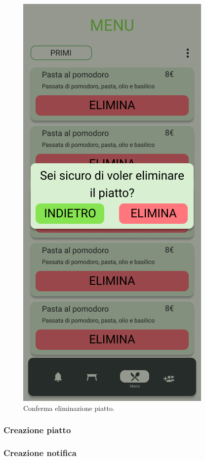 \begin{figure}[H]
  \centering
  \includegraphics[scale=0.6]{img/mock-up/Confirm_dish_deletion.png}
  \caption{Conferma eliminazione piatto.}
\end{figure} 
\subsubsection{Creazione piatto}

\subsubsection{Creazione notifica}